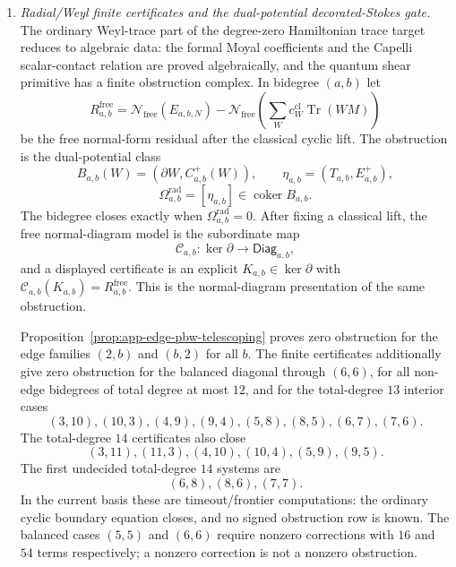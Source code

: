 \begin{enumerate}
  \item \emph{Radial/Weyl finite certificates and the
  dual-potential decorated-Stokes gate.}
  The ordinary Weyl-trace part of the degree-zero Hamiltonian trace
  target reduces to algebraic data: the formal Moyal coefficients and the
  Capelli scalar-contact relation are proved algebraically, and the
  quantum shear primitive has a finite obstruction complex.  In bidegree
  \((a,b)\) let
  \[
    R^{\mathrm{free}}_{a,b}
      =
      \mathcal N_{\mathrm{free}}(E_{a,b,N})
      -
      \mathcal N_{\mathrm{free}}
      \left(\sum_W c^{\mathrm{cl}}_W\operatorname{Tr}(WM)\right)
  \]
  be the free normal-form residual after the classical cyclic lift.
  The obstruction is the dual-potential class
  \[
    B_{a,b}(W)=(\partial W,C^+_{a,b}(W)),\qquad
    \eta_{a,b}=(T_{a,b},E^+_{a,b}),
  \]
  \[
    \Omega^{\mathrm{rad}}_{a,b}
    =
    [\eta_{a,b}]\in\operatorname{coker}B_{a,b}.
  \]
  The bidegree closes exactly when
  \(\Omega^{\mathrm{rad}}_{a,b}=0\).  After fixing a classical lift, the
  free normal-diagram model is the subordinate map
  \[
    \mathcal C_{a,b}\colon
    \ker\partial\longrightarrow\mathsf{Diag}_{a,b},
  \]
  and a displayed certificate is an explicit
  \(K_{a,b}\in\ker\partial\) with
  \(\mathcal C_{a,b}(K_{a,b})=R^{\mathrm{free}}_{a,b}\).  This is the
  normal-diagram presentation of the same obstruction.

  Proposition~\ref{prop:app-edge-pbw-telescoping} proves zero obstruction
  for the edge families \((2,b)\) and \((b,2)\) for all \(b\).  The
  finite certificates additionally give zero obstruction for the balanced
  diagonal through \((6,6)\), for all non-edge bidegrees of total degree
  at most \(12\), and for the total-degree \(13\) interior cases
  \[
    (3,10),(10,3),(4,9),(9,4),(5,8),(8,5),(6,7),(7,6).
  \]
  The total-degree \(14\) certificates also close
  \[
    (3,11),(11,3),(4,10),(10,4),(5,9),(9,5).
  \]
  The first undecided total-degree \(14\) systems are
  \[
    (6,8),(8,6),(7,7).
  \]
  In the current basis these are timeout/frontier computations: the
  ordinary cyclic boundary equation closes, and no signed obstruction
  row is known.  The balanced cases \((5,5)\) and \((6,6)\) require
  nonzero corrections with \(16\) and \(54\) terms respectively;
  a nonzero correction is not a nonzero obstruction.


\end{enumerate}
